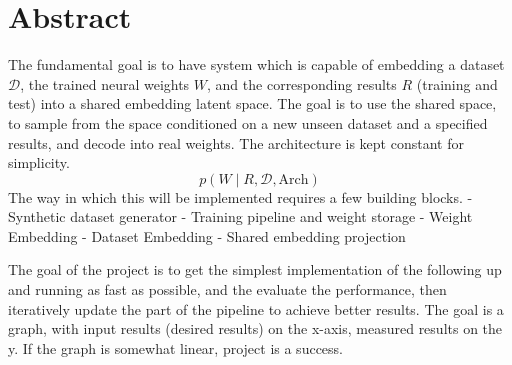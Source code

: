 \chapter*{Abstract}
\makeatletter{}\makeatother
The fundamental goal is to have system which is capable of embedding a dataset $\mathcal{D}$, the trained neural weights $W$, and the corresponding results $R$ (training and test) into a shared embedding latent space. The goal is to use the shared space, to sample from the space  conditioned on a new unseen dataset and a specified results, and decode into real weights.  The architecture is kept constant for simplicity. 
$$ p (W \mid R, \mathcal{D},\text{Arch})
$$
The way in which this will be implemented requires a few building blocks.
- Synthetic dataset generator
- Training pipeline and weight storage
- Weight Embedding
- Dataset Embedding
- Shared embedding projection

The goal of the project is to get the simplest implementation of the following up and running as fast as possible, and the evaluate the performance, then iteratively update the part of the pipeline to achieve better results. The goal is a graph, with input results (desired results) on the x-axis, measured results on the y. If the graph is somewhat linear, project is a success. 


